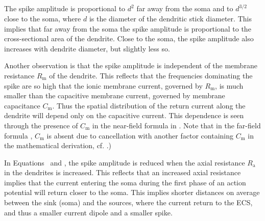 \subsection{}
The spike amplitude is proportional to $d^{2}$ far away from the soma and to $d^{3/2}$ close to the soma,
where $d$ is the diameter of the dendritic stick diameter. This implies that far away from the soma the spike amplitude is proportional to  the cross-sectional area of the dendrite. Close to the soma, the spike amplitude also increases with dendrite diameter, but slightly less so.

Another observation is that the spike amplitude is independent of the membrane resistance $R_\mathrm{m}$ of the dendrite.
This reflects that the frequencies dominating the spike are so high that the ionic membrane current, governed by $R_\mathrm{m}$, is
much smaller than the capacitive membrane current, governed by membrane capacitance $C_\mathrm{m}$.  
Thus the spatial distribution of the return current along the dendrite will depend only on the capacitive current. This dependence
is seen through the presence of  $C_\mathrm{m}$ in the near-field formula in . 
Note that in the far-field formula ,  $C_\mathrm{m}$ is absent due to cancellation with another factor containing $C_\mathrm{m}$ in the mathematical derivation, 
cf. .)

In Equations~ and , the spike amplitude is reduced when the 
axial resistance $R_\mathrm{a}$ in the dendrites is increased. This reflects that an increased axial resistance implies that the current entering
the soma during the first phase of an action potential will return closer to the soma. This implies shorter distances on average between the sink (soma) and the sources, where the current return to the ECS, and thus a smaller current dipole and a smaller spike.


